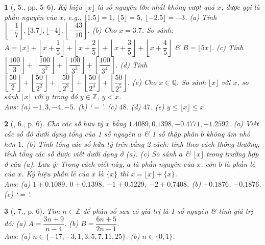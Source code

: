 \documentclass{article}
\newtheorem{baitoan}{}
\begin{document}
\begin{baitoan}[\cite{Binh_Toan_7_tap_1}, 5., pp. 5--6]
	Ký hiệu $\lfloor x\rfloor$ là số nguyên lớn nhất không vượt quá $x$, được gọi là \emph{phần nguyên} của $x$, e.g., $\lfloor 1.5\rfloor = 1$, $\lfloor 5\rfloor = 5$, $\lfloor -2.5\rfloor = -3$. (a) Tính $\left\lfloor-\dfrac{1}{7}\right\rfloor,\lfloor 3.7\rfloor,\lfloor-4\rfloor,\left\lfloor-\dfrac{43}{10}\right\rfloor$. (b) Cho $x = 3.7$. So sánh: $A = \lfloor x\rfloor + \left\lfloor x + \dfrac{1}{5}\right\rfloor + \left\lfloor x + \dfrac{2}{5}\right\rfloor + \left\lfloor x + \dfrac{3}{5}\right\rfloor + \left\lfloor x + \dfrac{4}{5}\right\rfloor$ \& $B = \lfloor 5x\rfloor$. (c) Tính $ \left\lfloor\dfrac{100}{3}\right\rfloor + \left\lfloor\dfrac{100}{3^2}\right\rfloor + \left\lfloor\dfrac{100}{3^3}\right\rfloor + \left\lfloor\dfrac{100}{3^4}\right\rfloor$. (d) Tính $\left\lfloor\dfrac{50}{2}\right\rfloor + \left\lfloor\dfrac{50}{2^2}\right\rfloor + \left\lfloor\dfrac{50}{2^3}\right\rfloor + \left\lfloor\dfrac{50}{2^4}\right\rfloor + \left\lfloor\dfrac{50}{2^5}\right\rfloor$.  (e) Cho $x\in\mathbb{Q}$. So sánh $\lfloor x\rfloor$ với $x$, so sánh $\lfloor x\rfloor$ với $y$ trong đó $y\in\mathbb{Z}$, $y < x$.\\\mbox{}\hfill{\sf Ans: (a) $-1,3,-4,-5$. (b) `$=$'. (c) $48$. (d) $47$. (e) $y\le\lfloor x\rfloor\le x$.}
\end{baitoan}

\begin{baitoan}[\cite{Binh_Toan_7_tap_1}, 6., p. 6]
	Cho các số hữu tỷ $x$ bằng $1.4089, 0.1398, -0.4771, -1.2592$. (a) Viết các số đó dưới dạng tổng của 1 số nguyên $a$ \& 1 số thập phân $b$ không âm nhỏ hơn $1$. (b) Tính tổng các số hữu tỷ trên bằng 2 cách: tính theo cách thông thường, tính tổng các số được viết dưới dạng ở (a). (c) So sánh $a$ \& $\lfloor x\rfloor$ trong trường hợp ở câu (a). Lưu ý: Trong cách viết này, $a$ là \emph{phần nguyên} của $x$, còn $b$ là \emph{phần lẻ} của $x$. Ký hiệu phần lẻ của $x$ là $\{x\}$ thì $x = \lfloor x\rfloor + \{x\}$.\\\mbox{}\hfill{\sf Ans: (a) $1 + 0.1089$, $0 + 0.1398$, $-1 + 0.5229$, $-2 + 0.7408$. (b) $-0.1876$, $-0.1876$. (c) `$=$'.}
\end{baitoan}

\begin{baitoan}[\cite{Binh_Toan_7_tap_1}, 7., p. 6]
	Tìm $n\in\mathbb{Z}$ để phân số sau có giá trị là 1 số nguyên \& tính giá trị đó: (a) $A = \dfrac{3n + 9}{n - 4}$. (b) $B = \dfrac{6n + 5}{2n - 1}$.\\\mbox{}\hfill{\sf Ans: (a) $n\in\{-17,-3,1,3,5,7,11,25\}$. (b) $n\in\{0,1\}$.}
\end{baitoan}
\end{document}
